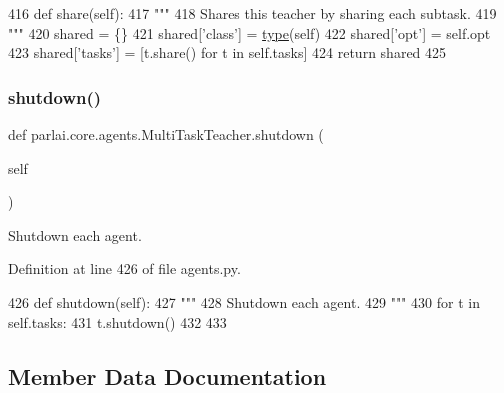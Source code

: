 \begin{DoxyCode}
416     \textcolor{keyword}{def }share(self):
417         \textcolor{stringliteral}{"""}
418 \textcolor{stringliteral}{        Shares this teacher by sharing each subtask.}
419 \textcolor{stringliteral}{        """}
420         shared = \{\}
421         shared[\textcolor{stringliteral}{'class'}] = \hyperlink{namespaceparlai_1_1agents_1_1tfidf__retriever_1_1build__tfidf_ad5dfae268e23f506da084a9efb72f619}{type}(self)
422         shared[\textcolor{stringliteral}{'opt'}] = self.opt
423         shared[\textcolor{stringliteral}{'tasks'}] = [t.share() \textcolor{keywordflow}{for} t \textcolor{keywordflow}{in} self.tasks]
424         \textcolor{keywordflow}{return} shared
425 
\end{DoxyCode}
\mbox{\label{classparlai_1_1core_1_1agents_1_1MultiTaskTeacher_a259dd3bec3f24669e835d8fbac657c3b}} 
\subsubsection{\texorpdfstring{shutdown()}{shutdown()}}
{\footnotesize\ttfamily def parlai.\+core.\+agents.\+Multi\+Task\+Teacher.\+shutdown (\begin{DoxyParamCaption}\item[{}]{self }\end{DoxyParamCaption})}

\begin{DoxyVerb}Shutdown each agent.
\end{DoxyVerb}
 

Definition at line 426 of file agents.\+py.


\begin{DoxyCode}
426     \textcolor{keyword}{def }shutdown(self):
427         \textcolor{stringliteral}{"""}
428 \textcolor{stringliteral}{        Shutdown each agent.}
429 \textcolor{stringliteral}{        """}
430         \textcolor{keywordflow}{for} t \textcolor{keywordflow}{in} self.tasks:
431             t.shutdown()
432 
433 
\end{DoxyCode}


\subsection{Member Data Documentation}
\mbox{\label{classparlai_1_1core_1_1agents_1_1MultiTaskTeacher_a1060c15dbbbe7fedfb89ba94969c5b99}} 
